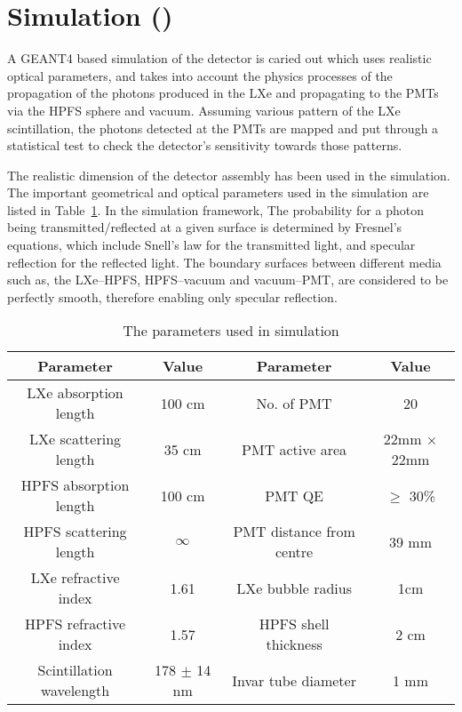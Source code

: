 \section{Simulation ()}
\label{sec:sim}
A GEANT4 based simulation of the detector is caried out which uses realistic optical parameters, 
and takes into account the physics processes of the propagation of the photons produced in the LXe 
and propagating to the PMTs via the HPFS sphere and vacuum. Assuming various pattern of the LXe 
scintillation, the photons detected at the PMTs are mapped and put through a statistical test to 
check the detector's sensitivity towards those patterns.

The realistic dimension of the detector assembly has been used in the simulation. The important 
geometrical and optical parameters used in the simulation are listed in Table~\ref{tab:OptPar}. 
In the simulation 
framework, The probability for a photon being transmitted/reflected at a given surface is 
determined by Fresnel's equations, which include Snell's law for the transmitted light, 
and specular reflection for the reflected light. The boundary surfaces between different media
such as, the LXe--HPFS, HPFS--vacuum and vacuum--PMT, are considered to be perfectly smooth, 
therefore enabling only specular reflection.

\begin{table}[h]
  \centering
  \caption{The parameters used in simulation}
  \label{tab:OptPar}
  \begin{tabular}{|c c||c c|}
  \hline
  Parameter & Value & Parameter & Value \\
  \hline
  LXe absorption length & 100 cm & No. of PMT & 20\\
  LXe scattering length & 35 cm & PMT active area & 22mm $\times$ 22mm\\
  HPFS absorption length & 100 cm & PMT QE & $\geq$ 30\% \\
  HPFS scattering length & $\infty$ & PMT distance from centre & 39 mm\\
  LXe refractive index & 1.61 & LXe bubble radius & 1cm\\
  HPFS refractive index & 1.57 & HPFS shell thickness & 2 cm \\
  Scintillation wavelength & 178 $\pm$ 14 nm & Invar tube diameter & 1 mm\\
  \hline
 \end{tabular}
\end{table}

